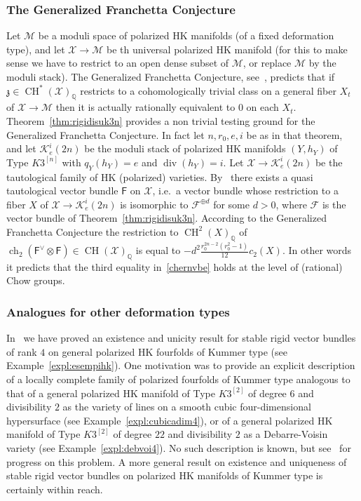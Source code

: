 \documentclass[11pt]{amsart}
\newcommand{\QQ}{{\mathbb Q}}
\let\mathcal\mathscr
\def\cF{\mathcal{F}}
\def\cK{\mathcal{K}}
\def\cM{\mathcal{M}}
\def\cX{\mathcal{X}}
\DeclareMathOperator{\ch}{ch}
\DeclareMathOperator{\CH}{CH}
\DeclareMathOperator{\divisore}{div}
\theoremstyle{definition}
\theoremstyle{remark}
\begin{document}
%
\subsubsection{The Generalized Franchetta Conjecture}
%
Let $\cM$ be a moduli space of polarized HK manifolds (of a fixed deformation type), and let $\cX\to\cM$ be th universal polarized HK manifold (for this to make sense we have to restrict to an open dense subset of $\cM$, or replace $\cM$ by the moduli stack). The Generalized Franchetta Conjecture, see~\cite{fulatvial:genfranchetta1}, predicts that if  ${\mathfrak z}\in \CH^{*}(\cX)_{\QQ}$ 
restricts to a cohomologically trivial class on a general fiber $X_t$ of $\cX\to\cM$ then it  is actually rationally equivalent to $0$ on each $X_t$.
Theorem~\ref{thm:rigidisuk3n} provides a non trivial testing ground for the Generalized Franchetta Conjecture. 
In fact let $n,r_0,e,i$  be as in that theorem, and let  $\cK_e^i(2n)$ be the moduli stack of polarized HK manifolds $(Y,h_Y)$ of Type $K3^{[n]}$ with  $q_{Y}(h_Y)=e$ and $\divisore(h_Y)=i$. Let $\cX\to \cK_e^i(2n)$ be the tautological family of HK (polarized) varieties. 
By~\cite[Thm.~A.5]{mukai:vbtata}   there exists a quasi tautological vector bundle $\mathsf F$ on $\cX$, i.e.~a vector bundle whose restriction to a fiber $X$ of 
$\cX\to \cK_e^i(2n)$ is isomorphic to $\cF^{\oplus d}$ for some $d>0$, where $\cF$ is the vector bundle of Theorem~\ref{thm:rigidisuk3n}. According to the Generalized Franchetta Conjecture  the restriction to $\CH^2(X)_{\QQ}$  of  
$\ch_2({\mathsf F}^{\vee}\otimes{\mathsf F})\in\CH(\cX)_{\QQ}$ is equal to  $-d^2\frac{r_0^{2n-2}(r_0^2-1)}{12}c_2(X)$. In other words it predicts that the third equality in~\eqref{chernvbe} holds at the level of (rational) Chow groups.  
%
\subsubsection{ Analogues for other deformation types}
%
In~\cite{og:fascikum} we have proved an existence and unicity result for stable rigid vector bundles of rank $4$ on  general polarized HK fourfolds of Kummer type (see Example~\ref{expl:esempihk}). One motivation was to provide an explicit description of a locally complete family 
of polarized fourfolds of Kummer type analogous to that of  a  general polarized HK manifold of Type $K3^{[2]}$ of degree $6$ and divisibility $2$ as the variety of lines on a smooth cubic four-dimensional hypersurface (see Example~\ref{expl:cubicadim4}), or of a general polarized HK manifold of Type $K3^{[2]}$ of degree $22$ and divisibility $2$ as a Debarre-Voisin variety (see Example~\ref{expl:debvoi4}).  No such description is known, but see~\cite{abgr:modellikum} for progress on this problem. A more general result on existence and uniqueness of stable rigid vector bundles on  polarized HK manifolds of Kummer type is certainly within reach. 
\end{document}
